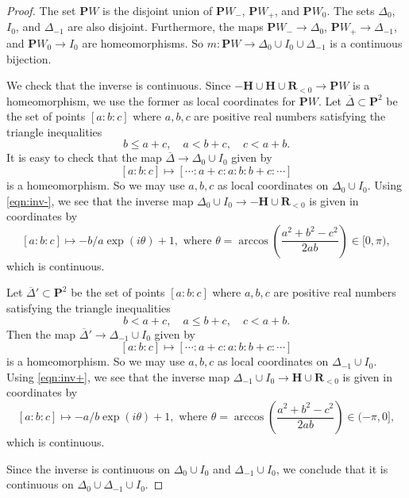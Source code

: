 \documentclass{amsart}
\begin{document}
\begin{proof}
  The set \(\mathbf{P}W\) is the disjoint union of \(\mathbf{P}W_-\), \(\mathbf{P}W_{+}\), and \(\mathbf{P}W_0\).
  The sets \(\Delta_0\), \(I_{0}\), and \(\Delta_{-1}\) are also disjoint.
  Furthermore, the maps \(\mathbf{P}W_- \to \Delta_0\), \(\mathbf{P}W_+ \to \Delta_{-1}\), and \(\mathbf{P}W_0 \to I_0\) are homeomorphisms.
  So \(m \colon \mathbf{P} W \to \Delta_0 \cup I_0 \cup \Delta_{-1}\) is a continuous bijection.

  We check that the inverse is continuous.
  Since \(-\mathbf{H} \cup \mathbf{H} \cup \mathbf{R}_{<0} \to \mathbf{P}W\) is a homeomorphism, we use the former as local coordinates for \(\mathbf{P} W\).
  Let \(\overline \Delta \subset \mathbf{P}^2\) be the set of points \([a:b:c]\) where \(a,b,c\) are positive real numbers satisfying the triangle inequalities
  \[ b \leq a+c, \quad a < b+c, \quad c < a+b.\]
  It is easy to check that the map \(\overline \Delta \to \Delta_0 \cup I_0\) given by
 \[ [a:b:c] \mapsto [\cdots :a+c:a:b:b+c: \cdots]\]
 is a homeomorphism.
 So we may use \(a,b,c\) as local coordinates on \(\Delta_0 \cup I_0\).
  Using \eqref{eqn:inv-}, we see that the inverse map \(\Delta_0 \cup I_0 \to -\mathbf{H} \cup \mathbf{R}_{<0}\) is given in coordinates by
  \[ [a:b:c] \mapsto  - b/a \exp(i \theta) + 1, \text{ where } \theta = \arccos \left( \frac{a^2+b^2-c^2}{2ab} \right) \in [0,\pi),\]
  which is continuous.

  Let \(\overline \Delta' \subset \mathbf{P}^2\) be the set of points \([a:b:c]\) where \(a,b,c\) are positive real numbers satisfying the triangle inequalities
  \[ b < a+c, \quad a \leq b+c, \quad c < a+b.\]
  Then the map \(\overline \Delta' \to \Delta_{-1} \cup I_0\) given by
  \[ [a:b:c] \mapsto [\cdots :a+c:a:b:b+c: \cdots]\]
  is a homeomorphism.
  So we may use \(a,b,c\) as local coordinates on \(\Delta_{-1} \cup I_0\).
  Using \eqref{eqn:inv+}, we see that the inverse map \(\Delta_{-1} \cup I_0 \to \mathbf{H} \cup \mathbf{R}_{<0}\) is given in coordinates by
  \[
    [a:b:c] \mapsto -a/b \exp(i \theta) + 1, \text{ where } \theta = \arccos \left( \frac{a^2+b^2-c^2}{2ab} \right) \in (-\pi,0],
  \]
  which is continuous.

  Since the inverse is continuous on \(\Delta_0 \cup I_0\) and \(\Delta_{-1} \cup I_0\), we conclude that it is continuous on \(\Delta_0 \cup \Delta_{-1} \cup I_0\).
\end{proof}
\end{document}
